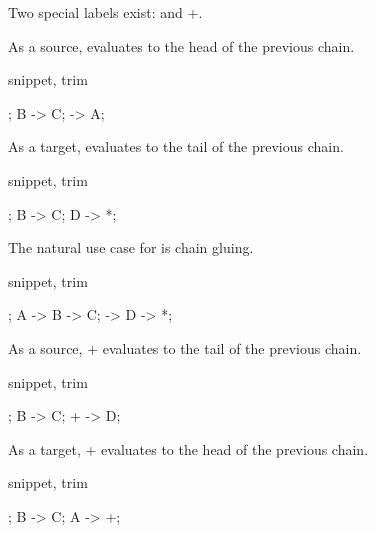 \begingroup{}

Two special labels exist: {\ttfamily *} and {\ttfamily +}.

As a source, {\ttfamily *} evaluates to the head of the previous chain.

\begin{tcblisting}{snippet, trim}
\begin{kodi}
;
\mor B -> C;
\mor * -> A;
\end{kodi}
\end{tcblisting}

As a target, {\ttfamily *} evaluates to the tail of the previous chain.

\begin{tcblisting}{snippet, trim}
\begin{kodi}
;
\mor B -> C;
\mor D -> *;
\end{kodi}
\end{tcblisting}

The natural use case for {\ttfamily *} is chain gluing.

\begin{tcblisting}{snippet, trim}
\begin{kodi}
;
\mor A -> B -> C;
\mor * -> D -> *;
\end{kodi}
\end{tcblisting}

As a source, {\ttfamily +} evaluates to the tail of the previous chain.

\begin{tcblisting}{snippet, trim}
\begin{kodi}
;
\mor B -> C;
\mor + -> D;
\end{kodi}
\end{tcblisting}

As a target, {\ttfamily +} evaluates to the head of the previous chain.

\begin{tcblisting}{snippet, trim}
\begin{kodi}
;
\mor B -> C;
\mor A -> +;
\end{kodi}
\end{tcblisting}

